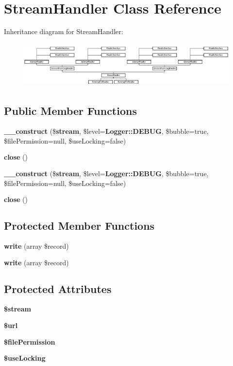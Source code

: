 \section{Stream\+Handler Class Reference}
\label{class_monolog_1_1_handler_1_1_stream_handler}
Inheritance diagram for Stream\+Handler\+:\begin{figure}[H]
\begin{center}
\leavevmode
\includegraphics[height=2.400000cm]{class_monolog_1_1_handler_1_1_stream_handler}
\end{center}
\end{figure}
\subsection*{Public Member Functions}
\begin{DoxyCompactItemize}
\item 
{\bf \+\_\+\+\_\+construct} (\${\bf stream}, \$level={\bf Logger\+::\+D\+E\+B\+U\+G}, \$bubble=true, \$file\+Permission=null, \$use\+Locking=false)
\item 
{\bf close} ()
\item 
{\bf \+\_\+\+\_\+construct} (\${\bf stream}, \$level={\bf Logger\+::\+D\+E\+B\+U\+G}, \$bubble=true, \$file\+Permission=null, \$use\+Locking=false)
\item 
{\bf close} ()
\end{DoxyCompactItemize}
\subsection*{Protected Member Functions}
\begin{DoxyCompactItemize}
\item 
{\bf write} (array \$record)
\item 
{\bf write} (array \$record)
\end{DoxyCompactItemize}
\subsection*{Protected Attributes}
\begin{DoxyCompactItemize}
\item 
{\bf \$stream}
\item 
{\bf \$url}
\item 
{\bf \$file\+Permission}
\item 
{\bf \$use\+Locking}
\end{DoxyCompactItemize}



